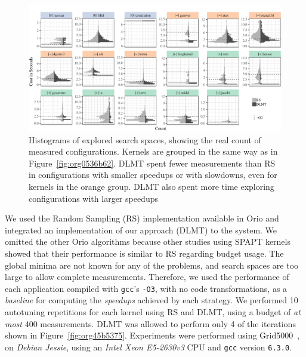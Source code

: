 \documentclass[conference]{IEEEtran}
\begin{document}
\begin{figure}[p]
\centering
\includegraphics[width=\textwidth]{./img/split_histograms.pdf}
\caption{\label{fig:orgc8b1732}
Histograms of explored search spaces, showing the real count of measured configurations. Kernels are grouped in the same way as in Figure~\ref{fig:org0536b62}. DLMT spent fewer measurements than RS in configurations with smaller speedups or with slowdowns, even for kernels in the orange group. DLMT also spent more time exploring configurations with larger speedups}
\end{figure}

We used the Random Sampling (RS) implementation available in Orio and integrated
an implementation  of our approach  (DLMT) to the  system. We omitted  the other
Orio      algorithms      because       other      studies      using      SPAPT
kernels~\cite{balaprakash2011can,balaprakash2012experimental} showed  that their
performance is similar  to RS regarding budget usage. The  global minima are not
known for any of the problems, and search spaces are too large to allow complete
measurements. Therefore,  we used the  performance of each  application compiled
with \texttt{gcc}'s  \texttt{-O3}, with no  code transformations, as  a \emph{baseline}
for computing the \emph{speedups} achieved by each strategy. We performed 10 autotuning
repetitions for  each kernel using RS  and DLMT, using  a budget of \emph{at  most} 400
measurements. DLMT  was allowed  to perform  only 4 of  the iterations  shown in
Figure~\ref{fig:org45b5375}.     Experiments      were     performed     using
Grid5000~\cite{balouek2013adding},  on  \emph{Debian  Jessie},   using  an  \emph{Intel  Xeon
E5-2630v3} CPU and \texttt{gcc} version \texttt{6.3.0}.
\end{document}
